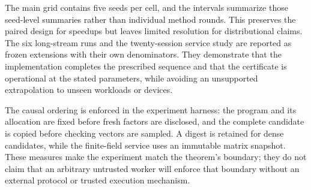 The main grid contains five seeds per cell, and the intervals summarize those
seed-level summaries rather than individual method rounds. This preserves the
paired design for speedups but leaves limited resolution for distributional
claims. The six long-stream runs and the twenty-session service study are
reported as frozen extensions with their own denominators. They demonstrate
that the implementation completes the prescribed sequence and that the
certificate is operational at the stated parameters, while avoiding an
unsupported extrapolation to unseen workloads or devices.

The causal ordering is enforced in the experiment harness: the program and
its allocation are fixed before fresh factors are disclosed, and the complete
candidate is copied before checking vectors are sampled. A digest is retained
for dense candidates, while the finite-field service uses an immutable matrix
snapshot. These measures make the experiment match the theorem's boundary;
they do not claim that an arbitrary untrusted worker will enforce that
boundary without an external protocol or trusted execution mechanism.
